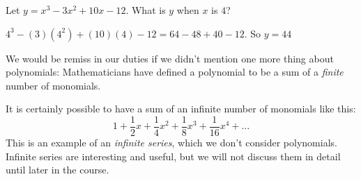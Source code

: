 \begin{Exercise}[title={Evaluate a Polynomial}, label=evaluatepolynomial]
  Let $y = x^3 - 3x^2 + 10x - 12$. What is $y$ when $x$ is $4$?
\end{Exercise}
\begin{Answer}[ref=evaluatepolynomial]
  $4^3 - (3)(4^2) + (10)(4) - 12 = 64 - 48 + 40 - 12$. So $y = 44$ 
\end{Answer}

We would be remiss in our duties if we didn't mention one more thing
about polynomials: Mathematicians have defined a polynomial to be a sum
of a \emph{finite} number of monomials.

It is certainly possible to have a sum of an infinite number of monomials
like this:
\begin{equation*}
1 + \frac{1}{2}x + \frac{1}{4}x^2 + \frac{1}{8}x^3 + \frac{1}{16}x^4 + \ldots
\end{equation*}
This is an example of an \emph{infinite series}, which we don't consider
polynomials. Infinite series are interesting and useful, but we 
will not discuss them in detail until later in the course.
